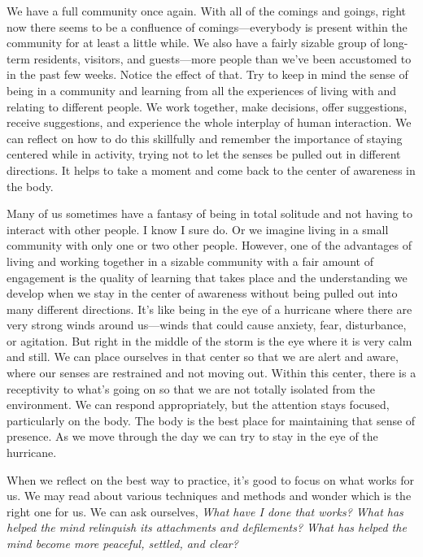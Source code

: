 We have a full community once again. With all of the comings and 
goings, right now there seems to be a confluence of comings---everybody 
is present within the community for at least a little while. We also 
have a fairly sizable group of long-term residents, visitors, and 
guests---more people than we've been accustomed to in the past few 
weeks. Notice the effect of that. Try to keep in mind the sense of 
being in a community and learning from all the experiences of living 
with and relating to different people. We work together, make 
decisions, offer suggestions, receive suggestions, and experience the 
whole interplay of human interaction. We can reflect on how to do this 
skillfully and remember the importance of staying centered while in 
activity, trying not to let the senses be pulled out in different 
directions. It helps to take a moment and come back to the center of 
awareness in the body.

Many of us sometimes have a fantasy of being in total solitude and not 
having to interact with other people. I know I sure do. Or we imagine 
living in a small community with only one or two other people. However, 
one of the advantages of living and working together in a sizable 
community with a fair amount of engagement is the quality of learning 
that takes place and the understanding we develop when we stay in the 
center of awareness without being pulled out into many different 
directions. It's like being in the eye of a hurricane where there are 
very strong winds around us---winds that could cause anxiety, fear, 
disturbance, or agitation. But right in the middle of the storm is the 
eye where it is very calm and still. We can place ourselves in that 
center so that we are alert and aware, where our senses are restrained 
and not moving out. Within this center, there is a receptivity to 
what's going on so that we are not totally isolated from the 
environment. We can respond appropriately, but the attention stays 
focused, particularly on the body. The body is the best place for 
maintaining that sense of presence. As we move through the day we can 
try to stay in the eye of the hurricane.


When we reflect on the best way to practice, it's good to focus on what 
works for us. We may read about various techniques and methods and 
wonder which is the right one for us. We can ask ourselves, \emph{What 
have I done that works? What has helped the mind relinquish its 
attachments and defilements? What has helped the mind become more 
peaceful, settled, and clear?}

